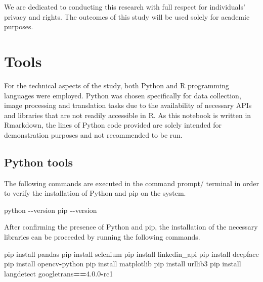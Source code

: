 \documentclass[11pt,]{article}
\newenvironment{Shaded}{\begin{snugshade}}{\end{snugshade}}
\newcommand{\FloatTok}[1]{\textcolor[rgb]{0.00,0.00,0.81}{#1}}
\newcommand{\NormalTok}[1]{#1}
\newcommand{\OperatorTok}[1]{\textcolor[rgb]{0.81,0.36,0.00}{\textbf{#1}}}
\begin{document}
We are dedicated to conducting this research with full respect for
individuals' privacy and rights. The outcomes of this study will be used
solely for academic purposes.

\hypertarget{tools}{%
\section{Tools}\label{tools}}

For the technical aspects of the study, both Python and R programming
languages were employed. Python was chosen specifically for data
collection, image processing and translation tasks due to the
availability of necessary APIs and libraries that are not readily
accessible in R. As this notebook is written in Rmarkdown, the lines of
Python code provided are solely intended for demonstration purposes and
not recommended to be run.

\hypertarget{python-tools}{%
\subsection{Python tools}\label{python-tools}}

The following commands are executed in the command prompt/ terminal in
order to verify the installation of Python and pip on the system.

\begin{Shaded}
\begin{Highlighting}[]
\NormalTok{python }\OperatorTok{{-}{-}}\NormalTok{version}
\NormalTok{pip }\OperatorTok{{-}{-}}\NormalTok{version}
\end{Highlighting}
\end{Shaded}

After confirming the presence of Python and pip, the installation of the
necessary libraries can be proceeded by running the following commands.

\begin{Shaded}
\begin{Highlighting}[]
\NormalTok{pip install pandas}
\NormalTok{pip install selenium}
\NormalTok{pip install linkedin\_api}
\NormalTok{pip install deepface}
\NormalTok{pip install opencv}\OperatorTok{{-}}\NormalTok{python}
\NormalTok{pip install matplotlib}
\NormalTok{pip install urllib3}
\NormalTok{pip install langdetect googletrans}\OperatorTok{==}\FloatTok{4.0.0}\OperatorTok{{-}}\NormalTok{rc1}
\end{Highlighting}
\end{Shaded}
\end{document}
